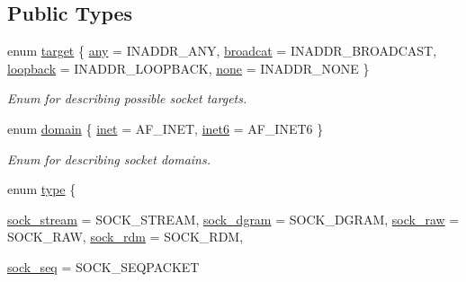 \subsection*{Public Types}
\begin{CompactItemize}
\item 
enum \hyperlink{classusock_1_1BaseSocket_50d8769de87937b42f8cef370917aa0b}{target} \{ \hyperlink{classusock_1_1BaseSocket_50d8769de87937b42f8cef370917aa0b13bac8e60708dc8451b1addafbd3dd77}{any} =  INADDR\_\-ANY, 
\hyperlink{classusock_1_1BaseSocket_50d8769de87937b42f8cef370917aa0b1bf59b5083e7c55e7bf86ec50291d617}{broadcat} =  INADDR\_\-BROADCAST, 
\hyperlink{classusock_1_1BaseSocket_50d8769de87937b42f8cef370917aa0bbefd2832243f347df978af6409917c38}{loopback} =  INADDR\_\-LOOPBACK, 
\hyperlink{classusock_1_1BaseSocket_50d8769de87937b42f8cef370917aa0b2e5c5b23744de44c69004e477510d95b}{none} =  INADDR\_\-NONE
 \}
\begin{CompactList}\small\item\em Enum for describing possible socket targets. \item\end{CompactList}\item 
enum \hyperlink{classusock_1_1BaseSocket_a51cae0b366638a5f697f64174135d90}{domain} \{ \hyperlink{classusock_1_1BaseSocket_a51cae0b366638a5f697f64174135d904293c75d794987e0017bab42bbbcbf73}{inet} =  AF\_\-INET, 
\hyperlink{classusock_1_1BaseSocket_a51cae0b366638a5f697f64174135d9089db67cd78ea92b1ca5bf823ca967680}{inet6} =  AF\_\-INET6
 \}
\begin{CompactList}\small\item\em Enum for describing socket domains. \item\end{CompactList}\item 
enum \hyperlink{classusock_1_1BaseSocket_8117d25c7b482eb594d68137868ce5f9}{type} \{ \par
\hyperlink{classusock_1_1BaseSocket_8117d25c7b482eb594d68137868ce5f94052647af14af3924e9b994a5ab53b8e}{sock\_\-stream} =  SOCK\_\-STREAM, 
\hyperlink{classusock_1_1BaseSocket_8117d25c7b482eb594d68137868ce5f95b0f0651f7544fbc1fedc8997d914365}{sock\_\-dgram} =  SOCK\_\-DGRAM, 
\hyperlink{classusock_1_1BaseSocket_8117d25c7b482eb594d68137868ce5f9d3b8cbf378c46eb82b5a0039eab34ca7}{sock\_\-raw} =  SOCK\_\-RAW, 
\hyperlink{classusock_1_1BaseSocket_8117d25c7b482eb594d68137868ce5f9e04a390261efe04335235f26a00b72d5}{sock\_\-rdm} =  SOCK\_\-RDM, 
\par
\hyperlink{classusock_1_1BaseSocket_8117d25c7b482eb594d68137868ce5f9adfa1bc59768fc0be580b4ba95c6f357}{sock\_\-seq} =  SOCK\_\-SEQPACKET

\end{CompactItemize}
